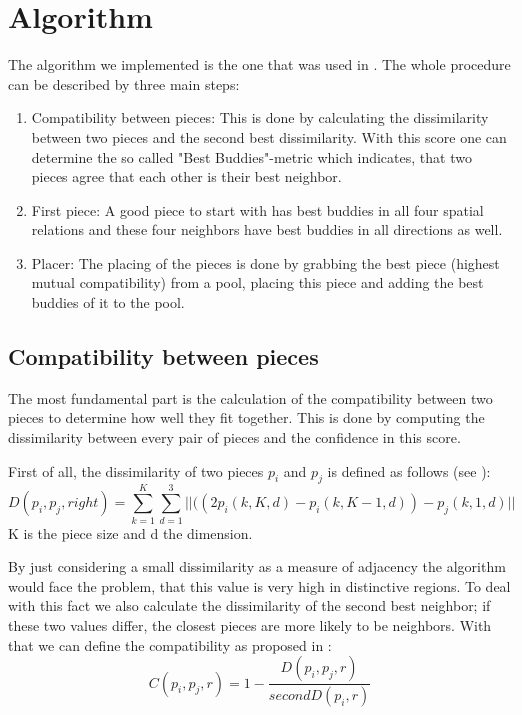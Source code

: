 \documentclass[]{report}
\begin{document}
\section{Algorithm}
The algorithm we implemented is the one that was used in \cite{Paikin2015}. The whole procedure can be described by three main steps:
\begin{enumerate}
	\item Compatibility between pieces: This is done by calculating the dissimilarity between two pieces and the second best dissimilarity. With this score one can determine the so called "Best Buddies"-metric which indicates, that two pieces agree that each other is their best neighbor.
	\item First piece: A good piece to start with has best buddies in all four spatial relations and these four neighbors have best buddies in all directions as well.
	\item Placer: The placing of the pieces is done by grabbing the best piece (highest mutual compatibility) from a pool, placing this piece and adding the best buddies of it to the pool.
\end{enumerate}

\subsection{Compatibility between pieces}
The most fundamental part is the calculation of the compatibility between two pieces to determine how well they fit together. This is done by computing the dissimilarity between every pair of pieces and the confidence in this score.

First of all, the dissimilarity of two pieces $p_i$ and $p_j$ is defined as follows (see \cite{Paikin2015}): 
\begin{equation}\label{eq:dissimilarity}
D(p_i,p_j,right) = \sum_{k=1}^K \sum_{d=1}^3 ||((2p_i(k,K,d) - p_i(k,K-1,d)) - p_j(k,1,d) ||
\end{equation}
K is the piece size and d the dimension.

By just considering a small dissimilarity as a measure of adjacency the algorithm would face the problem, that this value is very high in distinctive regions. To deal with this fact we also calculate the dissimilarity of the second best neighbor; if these two values differ, the closest pieces are more likely to be neighbors. With that we can define the compatibility as proposed in \cite{Paikin2015}:
\begin{equation}\label{eq:compatibility}
C(p_i,p_j,r) = 1 - \frac{D(p_i,p_j,r)}{secondD(p_i,r)}
\end{equation}
\end{document}

